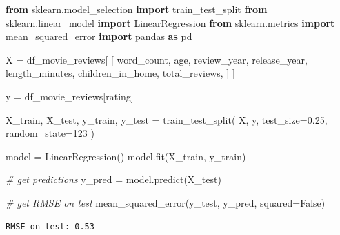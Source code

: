 \documentclass[
  letterpaper,
]{krantz}
\newenvironment{Shaded}{}{}
\newcommand{\CommentTok}[1]{\textcolor[rgb]{0.38,0.63,0.69}{\textit{#1}}}
\newcommand{\DecValTok}[1]{\textcolor[rgb]{0.25,0.63,0.44}{#1}}
\newcommand{\FloatTok}[1]{\textcolor[rgb]{0.25,0.63,0.44}{#1}}
\newcommand{\ImportTok}[1]{\textcolor[rgb]{0.00,0.50,0.00}{\textbf{#1}}}
\newcommand{\NormalTok}[1]{#1}
\newcommand{\OperatorTok}[1]{\textcolor[rgb]{0.40,0.40,0.40}{#1}}
\newcommand{\StringTok}[1]{\textcolor[rgb]{0.25,0.44,0.63}{#1}}
\newcommand{\VariableTok}[1]{\textcolor[rgb]{0.10,0.09,0.49}{#1}}
\begin{document}
\begin{Shaded}
\begin{Highlighting}[]
\ImportTok{from}\NormalTok{ sklearn.model\_selection }\ImportTok{import}\NormalTok{ train\_test\_split}
\ImportTok{from}\NormalTok{ sklearn.linear\_model }\ImportTok{import}\NormalTok{ LinearRegression}
\ImportTok{from}\NormalTok{ sklearn.metrics }\ImportTok{import}\NormalTok{ mean\_squared\_error}
\ImportTok{import}\NormalTok{ pandas }\ImportTok{as}\NormalTok{ pd}

\NormalTok{X }\OperatorTok{=}\NormalTok{ df\_movie\_reviews[}
\NormalTok{    [}
        \StringTok{\textquotesingle{}word\_count\textquotesingle{}}\NormalTok{,}
        \StringTok{\textquotesingle{}age\textquotesingle{}}\NormalTok{,}
        \StringTok{\textquotesingle{}review\_year\textquotesingle{}}\NormalTok{,}
        \StringTok{\textquotesingle{}release\_year\textquotesingle{}}\NormalTok{,}
        \StringTok{\textquotesingle{}length\_minutes\textquotesingle{}}\NormalTok{,}
        \StringTok{\textquotesingle{}children\_in\_home\textquotesingle{}}\NormalTok{,}
        \StringTok{\textquotesingle{}total\_reviews\textquotesingle{}}\NormalTok{,}
\NormalTok{    ]}
\NormalTok{]}

\NormalTok{y }\OperatorTok{=}\NormalTok{ df\_movie\_reviews[}\StringTok{\textquotesingle{}rating\textquotesingle{}}\NormalTok{]}

\NormalTok{X\_train, X\_test, y\_train, y\_test }\OperatorTok{=}\NormalTok{ train\_test\_split(}
\NormalTok{    X, y, test\_size}\OperatorTok{=}\FloatTok{0.25}\NormalTok{, random\_state}\OperatorTok{=}\DecValTok{123}
\NormalTok{)}

\NormalTok{model }\OperatorTok{=}\NormalTok{ LinearRegression()}
\NormalTok{model.fit(X\_train, y\_train)}
\end{Highlighting}
\end{Shaded}

\begin{Shaded}
\begin{Highlighting}[]
\CommentTok{\# get predictions}
\NormalTok{y\_pred }\OperatorTok{=}\NormalTok{ model.predict(X\_test)}

\CommentTok{\# get RMSE on test}
\NormalTok{mean\_squared\_error(y\_test, y\_pred, squared}\OperatorTok{=}\VariableTok{False}\NormalTok{)}
\end{Highlighting}
\end{Shaded}

\begin{verbatim}
RMSE on test: 0.53
\end{verbatim}
\end{document}
